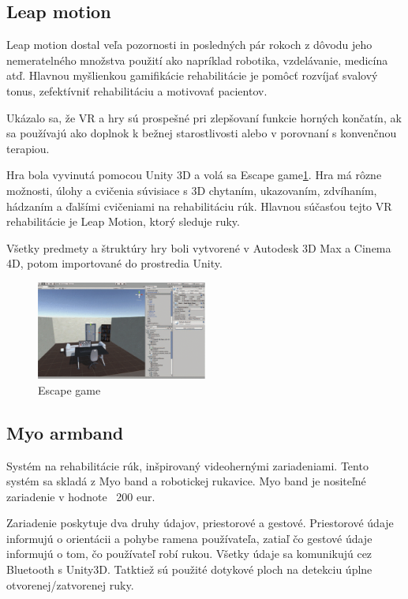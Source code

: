 \documentclass[10pt,twoside,slovak,a4paper]{article}
\begin{document}
\subsection{Leap motion}\cite{7926560}
Leap motion dostal veľa pozornosti in posledných pár rokoch z dôvodu jeho nemeratelného množstva použití ako napríklad robotika, vzdelávanie, medicína atď. Hlavnou myšlienkou gamifikácie rehabilitácie je pomôcť rozvíjať svalový tonus, zefektívniť rehabilitáciu a motivovať pacientov.

Ukázalo sa, že VR a hry sú prospešné pri zlepšovaní funkcie horných končatín, ak sa používajú ako doplnok k bežnej starostlivosti alebo v porovnaní s konvenčnou terapiou.

Hra bola vyvinutá  pomocou Unity 3D a volá sa Escape game\ref{fig:LeapMotion escape game}. Hra má rôzne možnosti, úlohy a cvičenia súvisiace s 3D chytaním, ukazovaním, zdvíhaním, hádzaním a ďalšími cvičeniami na rehabilitáciu rúk. Hlavnou súčasťou tejto VR rehabilitácie je Leap Motion, ktorý sleduje ruky. 

Všetky predmety a štruktúry hry boli vytvorené v Autodesk 3D Max a Cinema 4D, potom importované do prostredia Unity.

\begin{figure}
    \centering
    \includegraphics[width = 0.5\textwidth]{obrazky/Escape game.png}
    \caption{Escape game}
    \label{fig:LeapMotion escape game}
\end{figure}

\subsection{Myo armband}\cite{7088817}
Systém na rehabilitácie rúk, inšpirovaný videohernými zariadeniami. Tento systém sa skladá z Myo band a robotickej rukavice. Myo band je nositeľné zariadenie v hodnote ~200 eur.

Zariadenie poskytuje dva druhy údajov, priestorové a gestové. 
Priestorové údaje informujú o orientácii a pohybe ramena používateľa, zatiaľ čo gestové údaje informujú o tom, čo používateľ robí rukou. Všetky údaje sa komunikujú cez Bluetooth s Unity3D. Tatktiež sú použité dotykové ploch  na detekciu úplne otvorenej/zatvorenej ruky.
\end{document}
